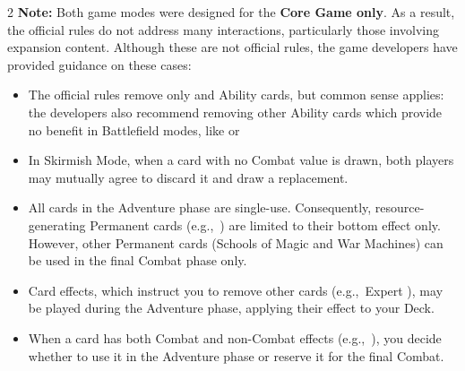 \begin{expansion}
\begin{multicols}{2}
  \textbf{Note:} Both game modes were designed for the \textbf{Core Game only}.
  As a result, the official rules do not address many interactions, particularly those involving expansion content.
  Although these are not official rules, the game developers have provided guidance on these cases:
  \begin{itemize}
    \item The official rules remove only  and  Ability cards, but common sense applies: the developers also recommend removing other Ability cards which provide no benefit in Battlefield modes, like  or 
    \item In Skirmish Mode, when a card with no Combat value is drawn, both players may mutually agree to discard it and draw a replacement.
    \item All cards in the Adventure phase are single-use.
      Consequently, resource-generating Permanent  cards (e.g.,~) are limited to their bottom  effect only.
      However, other Permanent  cards (Schools of Magic and War Machines) can be used in the final Combat phase only.
    \item Card effects, which instruct you to remove other cards (e.g.,~Expert ), may be played during the Adventure phase, applying their effect to your Deck.
    \item When a card has both Combat and non-Combat effects (e.g.,~), you decide whether to use it in the Adventure phase or reserve it for the final Combat.
  \end{itemize}
  \end{multicols}
\end{expansion}

